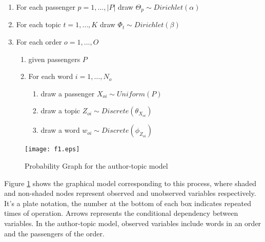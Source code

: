 \documentclass{llncs}
\begin{document}
\begin{enumerate}
\item For each passenger $p=1,\dots,|P|$ draw $\Theta_p \sim Dirichlet(\alpha)$
\item For each topic $t=1,\dots,K$ draw $\Phi_t \sim Dirichlet(\beta)$
\item For each order $o=1,\dots,O$
       \begin{enumerate}[fullwidth,itemindent=1em,label=(\alph*)]
       \item given passengers $P$
       \item For each word $i=1,\dots, N_o$
              \begin{enumerate}[fullwidth,itemindent=2em,label=(\roman*)]
              \item draw a passenger $X_{oi} \sim Uniform(P)$
              \item draw a topic $Z_{oi} \sim Discrete(\theta_{X_{oi}})$
              \item draw a word $w_{oi} \sim Discrete(\phi_{Z_{oi}})$
              \end{enumerate}
       \end{enumerate}
\end{enumerate}
\begin{figure}[!hbt]
\centering
\texttt{[image: f1.eps]}
\caption{Probability Graph for the author-topic model}
\label{fig:mod}
\end{figure}\par
Figure \ref{fig:mod} shows the graphical model corresponding to this process, where shaded and non-shaded nodes represent observed and unobserved variables respectively. It's a plate notation, the number at the bottom of each box indicates repeated times of operation. Arrows represents the conditional dependency between variables. In the author-topic model, observed variables include words in an order and the passengers of the order.
\end{document}
